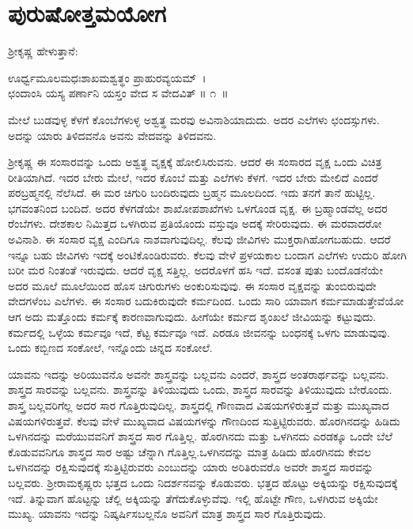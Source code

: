 
\chapter{ಪುರುಷೋತ್ತಮಯೋಗ}

ಶ‍್ರೀಕೃಷ್ಣ ಹೇಳುತ್ತಾನೆ:

\begin{shloka}
ಊರ್ಧ್ವಮೂಲಮಧಃಶಾಖಮಶ್ವತ್ಥಂ ಪ್ರಾಹುರವ್ಯಯಮ್~।\\ಛಂದಾಂಸಿ ಯಸ್ಯ ಪರ್ಣಾನಿ ಯಸ್ತಂ ವೇದ ಸ ವೇದವಿತ್ \hfill॥ ೧~॥
\end{shloka}

\begin{artha}
ಮೇಲೆ ಬುಡವುಳ್ಳ ಕೆಳಗೆ ಕೊಂಬೆಗಳುಳ್ಳ ಅಶ್ವತ್ಥ ಮರವು ಅವಿನಾಶಿಯಾದುದು. ಅದರ ಎಲೆಗಳು ಛಂದಸ್ಸುಗಳು. ಅದನ್ನು ಯಾರು ತಿಳಿದವನೊ ಅವನು ವೇದವನ್ನು ತಿಳಿದವನು.
\end{artha}

ಶ‍್ರೀಕೃಷ್ಣ ಈ ಸಂಸಾರವನ್ನು ಒಂದು ಅಶ್ವತ್ಥ ವೃಕ್ಷಕ್ಕೆ ಹೋಲಿಸಿರುವನು. ಆದರೆ ಈ ಸಂಸಾರದ ವೃಕ್ಷ ಒಂದು ವಿಚಿತ್ರ ರೀತಿಯಾಗಿದೆ. ಇದರ ಬೇರು ಮೇಲೆ, ಇದರ ಕೊಂಬೆ ಮತ್ತು ಎಲೆಗಳು ಕೆಳಗೆ. ಇದರ ಬೇರು ಮೇಲಿದೆ ಎಂದರೆ ಪರಬ್ರಹ್ಮನಲ್ಲಿ ನೆಲೆಸಿದೆ. ಈ ಮರ ಚಿಗುರಿ ಬಂದಿರುವುದು ಬ್ರಹ್ಮನ ಮೂಲದಿಂದ. ಇದು ತನಗೆ ತಾನೆ ಹುಟ್ಟಿಲ್ಲ. ಭಗವಂತನಿಂದ ಬಂದಿದೆ. ಅದರ ಕೆಳಗಡೆಯೇ ಶಾಖೋಪಶಾಖೆಗಳು ಒಳಗೊಂಡ ವೃಕ್ಷ. ಈ ಬ್ರಹ್ಮಾಂಡವೆಲ್ಲ ಅದರ ರೆಂಬೆಗಳು. ದೇಶಕಾಲ ನಿಮಿತ್ತದ ಒಳಗಿರುವ ಪ್ರತಿಯೊಂದು ವಸ್ತುವೂ ಅದಕ್ಕೆ ಸೇರಿರುವುದು. ಈ ಮರವಾದರೋ ಅವಿನಾಶಿ. ಈ ಸಂಸಾರ ವೃಕ್ಷ ಎಂದಿಗೂ ನಾಶವಾಗುವುದಿಲ್ಲ. ಕೆಲವು ಜೀವಿಗಳು ಮುಕ್ತರಾಗಿಹೋಗಬಹುದು. ಆದರೆ ಇನ್ನೂ ಬಹು ಜೀವಿಗಳು ಇದಕ್ಕೆ ಅಂಟಿಕೊಂಡಿರುವರು. ಕೆಲವು ವೇಳೆ ಪ್ರಳಯಕಾಲ ಬಂದಾಗ ಎಲೆಗಳು ಉದುರಿ ಹೋಗಿ ಬರೀ ಮರ ನಿಂತಂತೆ ಇರುವುದು. ಆದರೆ ವೃಕ್ಷ ಸತ್ತಿಲ್ಲ. ಅದರೊಳಗೆ ಹಸಿ ಇದೆ. ವಸಂತ ಪುತು ಬಂದೊಡನೆಯೇ ಅದರ ಮೂಲೆ ಮೂಲೆಯಿಂದ ಹೊಸ ಚಿಗುರುಗಳು ಅಂಕುರಿಸುವುವು. ಈ ಸಂಸಾರ ವೃಕ್ಷವನ್ನು ತುಂಬಿರುವುದೇ ವೇದಗಳೆಂಬ ಎಲೆಗಳು. ಈ ಸಂಸಾರ ಬದುಕಿರುವುದೇ ಕರ್ಮದಿಂದ. ಒಂದು ಸಾರಿ ಯಾವಾಗ ಕರ್ಮಮಾಡುತ್ತೇವೆಯೋ ಆಗ ಅದು ಮತ್ತೊಂದು ಕರ್ಮಕ್ಕೆ ಕಾರಣವಾಗುವುದು. ಹೀಗೆಯೇ ಕರ್ಮದ ಶೃಂಖಲೆ ಜೀವಿಯನ್ನು ಕಟ್ಟುವುದು. ಕರ್ಮದಲ್ಲಿ ಒಳ್ಳೆಯ ಕರ್ಮವೂ ಇದೆ, ಕೆಟ್ಟ ಕರ್ಮವೂ ಇದೆ. ಎರಡೂ ಜೀವನನ್ನು ಬಂಧನಕ್ಕೆ ಒಳಗು ಮಾಡುವುವು. ಒಂದು ಕಬ್ಬಿಣದ ಸಂಕೋಲೆ, ಇನ್ನೊಂದು ಚಿನ್ನದ ಸಂಕೋಲೆ.

ಯಾವನು ಇದನ್ನು ಅರಿಯುವನೊ ಅವನೇ ಶಾಸ್ತ್ರವನ್ನು ಬಲ್ಲವನು ಎಂದರೆ, ಶಾಸ್ತ್ರದ ಅಂತರಾರ್ಥವನ್ನು ಬಲ್ಲವನು. ಶಾಸ್ತ್ರದ ಸಾರವನ್ನು ಬಲ್ಲವನು. ಶಾಸ್ತ್ರವನ್ನು ತಿಳಿಯುವುದು ಒಂದು, ಶಾಸ್ತ್ರದ ಸಾರವನ್ನು ತಿಳಿಯುವುದು ಬೇರೊಂದು. ಶಾಸ್ತ್ರ ಬಲ್ಲವರಿಗೆಲ್ಲ ಅದರ ಸಾರ ಗೊತ್ತಿರುವುದಿಲ್ಲ. ಶಾಸ್ತ್ರದಲ್ಲಿ ಗೌಣವಾದ ವಿಷಯಗಳಿರುತ್ತವೆ ಮತ್ತು ಮುಖ್ಯವಾದ ವಿಷಯಗಳಿರುತ್ತವೆ. ಕೆಲವು ವೇಳೆ ಮುಖ್ಯವಾದ ವಿಷಯಗಳನ್ನು ಗೌಣದಿಂದ ಸುತ್ತಿಟ್ಟಿರುವರು. ಹೊರಗಿನದನ್ನು ಹಿಡಿದು ಒಳಗಿನದನ್ನು ಮರೆಯುವವನಿಗೆ ಶಾಸ್ತ್ರದ ಸಾರ ಗೊತ್ತಿಲ್ಲ. ಹೊರಗಿನದು ಮತ್ತು ಒಳ\-ಗಿನದು ಎರಡಕ್ಕೂ ಒಂದೇ ಬೆಲೆ ಕೊಡುವವನಿಗೂ ಶಾಸ್ತ್ರದ ಸಾರ ಅಷ್ಟು ಚೆನ್ನಾಗಿ ಗೊತ್ತಿಲ್ಲ.\break ಒಳಗಿನದನ್ನು ಮಾತ್ರ ಹಿಡಿದು ಹೊರಗಿನದು ಕೇವಲ ಒಳಗಿನದನ್ನು ರಕ್ಷಿಸುವುದಕ್ಕೆ ಸುತ್ತಿಟ್ಟಿರುವರು ಎಂಬುದನ್ನು ಯಾರು ಅರಿತಿರುವರೊ ಅವರೇ ಶಾಸ್ತ್ರದ ಸಾರವನ್ನು ಬಲ್ಲವರು. ಶ‍್ರೀರಾಮಕೃಷ್ಣರು ಭತ್ತದ ಒಂದು ನಿದರ್ಶನವನ್ನು ಕೊಡುವರು. ಭತ್ತದ ಹೊಟ್ಟು ಅಕ್ಕಿಯನ್ನು ರಕ್ಷಿಸುವುದಕ್ಕೆ ಇದೆ. ತಿನ್ನುವಾಗ ಹೊಟ್ಟನ್ನು ಚೆಲ್ಲಿ ಅಕ್ಕಿಯನ್ನು ತೆಗೆದುಕೊಳ್ಳುವೆವು. ಇಲ್ಲಿ ಹೊಟ್ಟೇ ಗೌಣ, ಒಳಗಿರುವ ಅಕ್ಕಿಯೇ ಮುಖ್ಯ. ಯಾವನು ಇದನ್ನು ನಿಷ್ಕರ್ಷಿಸಬಲ್ಲನೊ ಅವನಿಗೆ ಮಾತ್ರ ಶಾಸ್ತ್ರದ ಸಾರ ಗೊತ್ತಿರುವುದು.

